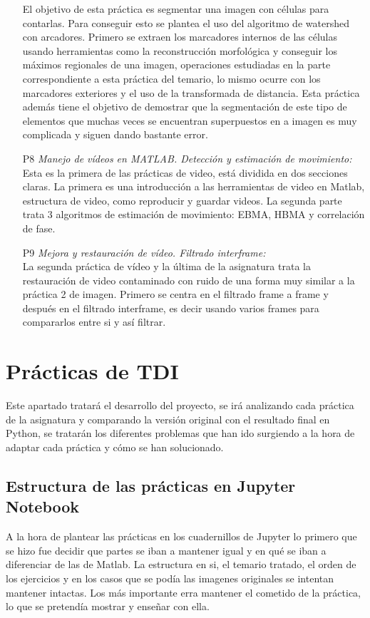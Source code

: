 \documentclass[a4paper,12pt]{report}
\begin{document}
\begin{itemize}
	El objetivo de esta práctica es segmentar una imagen con células para contarlas. Para conseguir esto se plantea el uso del algoritmo de watershed con arcadores. Primero se extraen los marcadores internos de las células usando herramientas como la reconstrucción morfológica y conseguir los máximos regionales de una imagen, operaciones estudiadas en la parte correspondiente a esta práctica del temario, lo mismo ocurre con los marcadores exteriores y el uso de la transformada de distancia. Esta práctica además tiene el objetivo de demostrar que la segmentación de este tipo de elementos que muchas veces se encuentran superpuestos en a imagen es muy complicada y siguen dando bastante error.
  \item [P8]\emph{Manejo de vídeos en MATLAB. Detección y estimación de movimiento:}\\
	Esta es la primera de las prácticas de video, está dividida en dos secciones claras. La primera es una introducción a las herramientas de video en Matlab, estructura de video, como reproducir y guardar videos. La segunda parte trata 3 algoritmos de estimación de movimiento: EBMA, HBMA y correlación de fase.
  \item [P9]\emph{Mejora y restauración de vídeo. Filtrado interframe:}\\
	La segunda práctica de vídeo y la última de la asignatura trata la restauración de video contaminado con ruido de una forma muy similar a la práctica 2 de imagen. Primero se centra en el filtrado frame a frame y después en el filtrado interframe, es decir usando varios frames para compararlos entre si y así filtrar.
\end{itemize}

\chapter{Prácticas de TDI}

Este apartado tratará el desarrollo del proyecto, se irá analizando cada práctica de la asignatura y comparando la versión original con el resultado final en Python, se tratarán los diferentes problemas que han ido surgiendo a la hora de adaptar cada práctica y cómo se han solucionado.\\

\section{Estructura de las prácticas en Jupyter Notebook}

A la hora de plantear las prácticas en los cuadernillos de Jupyter lo primero que se hizo fue decidir que partes se iban a mantener igual y en qué se iban a diferenciar de las de Matlab. La estructura en si, el temario tratado, el orden de los ejercicios y en los casos que se podía las imagenes originales se intentan mantener intactas. Los más importante erra mantener el cometido de la práctica, lo que se pretendía mostrar y enseñar con ella.\\
\end{document}
